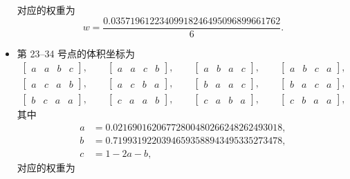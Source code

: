 \begin{itemize}[wide]
\begin{equation}
\end{equation}
对应的权重为
\begin{equation}
w=\frac{0.03571961223409918246495096899661762}{6}.
\end{equation}
\item 第 23–34 号点的体积坐标为
\begin{equation}
\begin{gathered}\begin{bmatrix}a & a & b & c\end{bmatrix},\qquad\begin{bmatrix}a & a & c & b\end{bmatrix},\qquad\begin{bmatrix}a & b & a & c\end{bmatrix},\qquad\begin{bmatrix}a & b & c & a\end{bmatrix},\\
\begin{bmatrix}a & c & a & b\end{bmatrix},\qquad\begin{bmatrix}a & c & b & a\end{bmatrix},\qquad\begin{bmatrix}b & a & a & c\end{bmatrix},\qquad\begin{bmatrix}b & a & c & a\end{bmatrix},\\
\begin{bmatrix}b & c & a & a\end{bmatrix},\qquad\begin{bmatrix}c & a & a & b\end{bmatrix},\qquad\begin{bmatrix}c & a & b & a\end{bmatrix},\qquad\begin{bmatrix}c & b & a & a\end{bmatrix},
\end{gathered}
\end{equation}
其中
\begin{equation}
\begin{aligned}a & =0.02169016206772800480266248262493018,\\
b & =0.71993192203946593588943495335273478,\\
c & =1-2a-b,
\end{aligned}
\end{equation}
对应的权重为
\begin{equation}

\end{equation}
\end{itemize}
